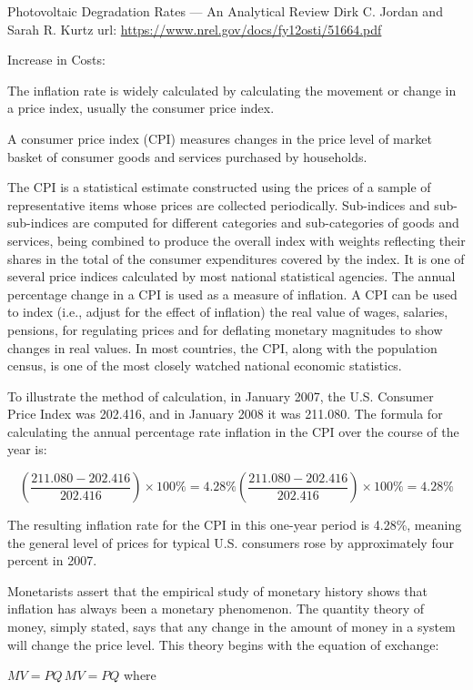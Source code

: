 \documentclass[]{book}
\theoremstyle{definition}
\theoremstyle{definition}
\theoremstyle{definition}
\theoremstyle{remark}
\begin{document}
Photovoltaic Degradation Rates --- An Analytical Review Dirk C. Jordan
and Sarah R. Kurtz url:
\url{https://www.nrel.gov/docs/fy12osti/51664.pdf}

Increase in Costs:

The inflation rate is widely calculated by calculating the movement or
change in a price index, usually the consumer price index.

A consumer price index (CPI) measures changes in the price level of
market basket of consumer goods and services purchased by households.

The CPI is a statistical estimate constructed using the prices of a
sample of representative items whose prices are collected periodically.
Sub-indices and sub-sub-indices are computed for different categories
and sub-categories of goods and services, being combined to produce the
overall index with weights reflecting their shares in the total of the
consumer expenditures covered by the index. It is one of several price
indices calculated by most national statistical agencies. The annual
percentage change in a CPI is used as a measure of inflation. A CPI can
be used to index (i.e., adjust for the effect of inflation) the real
value of wages, salaries, pensions, for regulating prices and for
deflating monetary magnitudes to show changes in real values. In most
countries, the CPI, along with the population census, is one of the most
closely watched national economic statistics.

To illustrate the method of calculation, in January 2007, the U.S.
Consumer Price Index was 202.416, and in January 2008 it was 211.080.
The formula for calculating the annual percentage rate inflation in the
CPI over the course of the year is:

\[{\displaystyle \left({\frac {211.080-202.416}{202.416}}\right)\times 100\%=4.28\%} \left({\frac {211.080-202.416}{202.416}}\right)\times 100\%=4.28\%\]

The resulting inflation rate for the CPI in this one-year period is
4.28\%, meaning the general level of prices for typical U.S. consumers
rose by approximately four percent in 2007.

Monetarists assert that the empirical study of monetary history shows
that inflation has always been a monetary phenomenon. The quantity
theory of money, simply stated, says that any change in the amount of
money in a system will change the price level. This theory begins with
the equation of exchange:

\({\displaystyle MV=PQ \, MV=PQ}\) where
\end{document}
